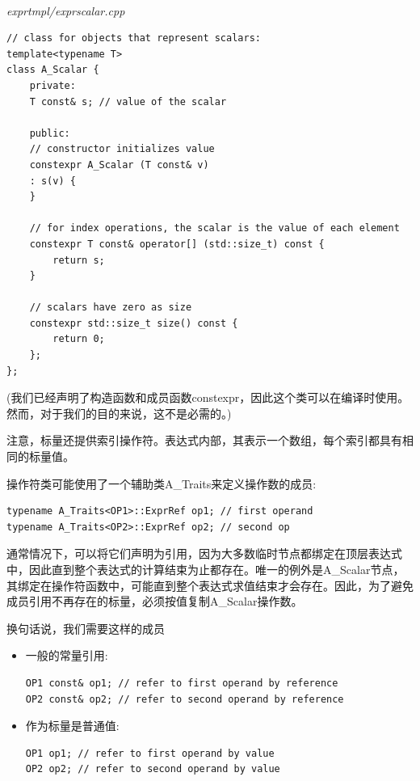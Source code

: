 \hspace*{\fill} \\ %
\noindent
\textit{exprtmpl/exprscalar.cpp}
\begin{lstlisting}[style=styleCXX]
// class for objects that represent scalars:
template<typename T>
class A_Scalar {
	private:
	T const& s; // value of the scalar
	
	public:
	// constructor initializes value
	constexpr A_Scalar (T const& v)
	: s(v) {
	}

	// for index operations, the scalar is the value of each element
	constexpr T const& operator[] (std::size_t) const {
		return s;
	}

	// scalars have zero as size
	constexpr std::size_t size() const {
		return 0;
	};
};
\end{lstlisting}

(我们已经声明了构造函数和成员函数constexpr，因此这个类可以在编译时使用。然而，对于我们的目的来说，这不是必需的。)

注意，标量还提供索引操作符。表达式内部，其表示一个数组，每个索引都具有相同的标量值。

操作符类可能使用了一个辅助类A\_Traits来定义操作数的成员:

\begin{lstlisting}[style=styleCXX]
typename A_Traits<OP1>::ExprRef op1; // first operand
typename A_Traits<OP2>::ExprRef op2; // second op
\end{lstlisting}

通常情况下，可以将它们声明为引用，因为大多数临时节点都绑定在顶层表达式中，因此直到整个表达式的计算结束为止都存在。唯一的例外是A\_Scalar节点，其绑定在操作符函数中，可能直到整个表达式求值结束才会存在。因此，为了避免成员引用不再存在的标量，必须按值复制A\_Scalar操作数。

换句话说，我们需要这样的成员

\begin{itemize}
\item 
一般的常量引用:
\begin{lstlisting}[style=styleCXX]
OP1 const& op1; // refer to first operand by reference
OP2 const& op2; // refer to second operand by reference
\end{lstlisting}

\item 
作为标量是普通值:
\begin{lstlisting}[style=styleCXX]
OP1 op1; // refer to first operand by value
OP2 op2; // refer to second operand by value
\end{lstlisting}
\end{itemize}

